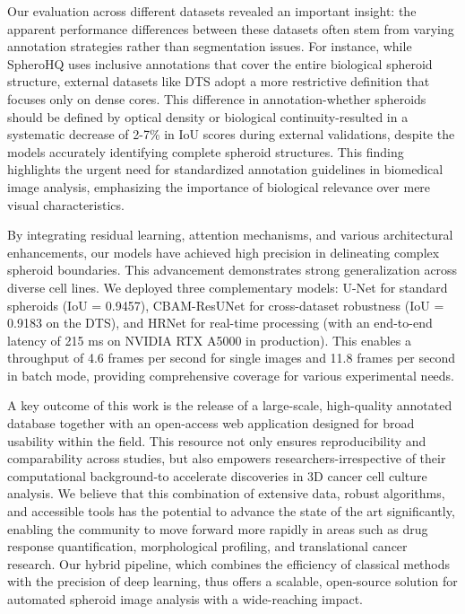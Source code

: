 \documentclass[preprint,12pt]{elsarticle}
\newcommand{\dsHQ}{SpheroHQ}
\newcommand{\dsDTS}{DTS}
\begin{document}
Our evaluation across different datasets revealed an important insight: the apparent performance differences between these datasets often stem from varying annotation strategies rather than segmentation issues. For instance, while \dsHQ{} uses inclusive annotations that cover the entire biological spheroid structure, external datasets like \dsDTS{} adopt a more restrictive definition that focuses only on dense cores. This difference in annotation-whether spheroids should be defined by optical density or biological continuity-resulted in a systematic decrease of 2-7\% in IoU scores during external validations, despite the models accurately identifying complete spheroid structures. This finding highlights the urgent need for standardized annotation guidelines in biomedical image analysis, emphasizing the importance of biological relevance over mere visual characteristics.

By integrating residual learning, attention mechanisms, and various architectural enhancements, our models have achieved high precision in delineating complex spheroid boundaries. This advancement demonstrates strong generalization across diverse cell lines. We deployed three complementary models: U-Net for standard spheroids (IoU = 0.9457), CBAM-ResUNet for cross-dataset robustness (IoU = 0.9183 on the \dsDTS{}), and HRNet for real-time processing (with an end-to-end latency of 215 ms on NVIDIA RTX A5000 in production). This enables a throughput of 4.6 frames per second for single images and 11.8 frames per second in batch mode, providing comprehensive coverage for various experimental needs. 

A key outcome of this work is the release of a large-scale, high-quality annotated database together with an open-access web application designed for broad usability within the field. This resource not only ensures reproducibility and comparability across studies, but also empowers researchers-irrespective of their computational background-to accelerate discoveries in 3D cancer cell culture analysis. We believe that this combination of extensive data, robust algorithms, and accessible tools has the potential to advance the state of the art significantly, enabling the community to move forward more rapidly in areas such as drug response quantification, morphological profiling, and translational cancer research. Our hybrid pipeline, which combines the efficiency of classical methods with the precision of deep learning, thus offers a scalable, open-source solution for automated spheroid image analysis with a wide-reaching impact.
\end{document}
